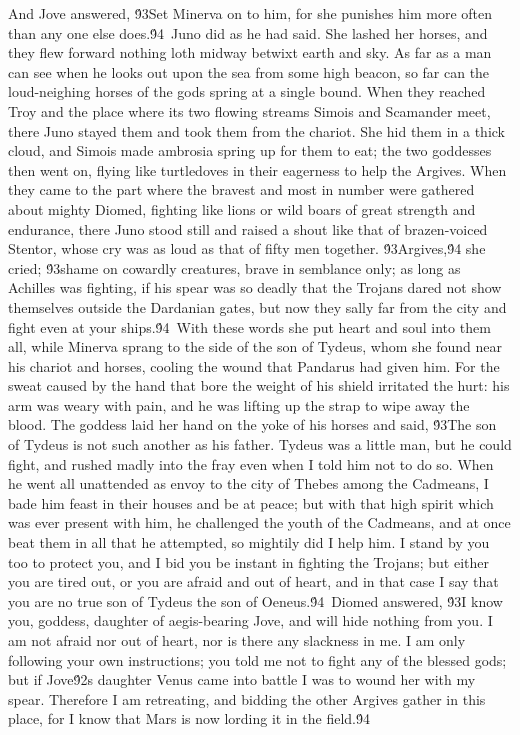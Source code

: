 {And Jove answered, \'93Set Minerva on to him, for she punishes him more often than any one else does.\'94\
Juno did as he had said. She lashed her horses, and they flew forward nothing loth midway betwixt earth and sky. As far as a man can see when he looks out upon the sea from some high beacon, so far can the loud-neighing horses of the gods spring at a single bound. When they reached Troy and the place where its two flowing streams Simois and Scamander meet, there Juno stayed them and took them from the chariot. She hid them in a thick cloud, and Simois made ambrosia spring up for them to eat; the two goddesses then went on, flying like turtledoves in their eagerness to help the Argives. When they came to the part where the bravest and most in number were gathered about mighty Diomed, fighting like lions or wild boars of great strength and endurance, there Juno stood still and raised a shout like that of brazen-voiced Stentor, whose cry was as loud as that of fifty men together. \'93Argives,\'94 she cried; \'93shame on cowardly creatures, brave in semblance only; as long as Achilles was fighting, if his spear was so deadly that the Trojans dared not show themselves outside the Dardanian gates, but now they sally far from the city and fight even at your ships.\'94\
With these words she put heart and soul into them all, while Minerva sprang to the side of the son of Tydeus, whom she found near his chariot and horses, cooling the wound that Pandarus had given him. For the sweat caused by the hand that bore the weight of his shield irritated the hurt: his arm was weary with pain, and he was lifting up the strap to wipe away the blood. The goddess laid her hand on the yoke of his horses and said, \'93The son of Tydeus is not such another as his father. Tydeus was a little man, but he could fight, and rushed madly into the fray even when I told him not to do so. When he went all unattended as envoy to the city of Thebes among the Cadmeans, I bade him feast in their houses and be at peace; but with that high spirit which was ever present with him, he challenged the youth of the Cadmeans, and at once beat them in all that he attempted, so mightily did I help him. I stand by you too to protect you, and I bid you be instant in fighting the Trojans; but either you are tired out, or you are afraid and out of heart, and in that case I say that you are no true son of Tydeus the son of Oeneus.\'94\
Diomed answered, \'93I know you, goddess, daughter of aegis-bearing Jove, and will hide nothing from you. I am not afraid nor out of heart, nor is there any slackness in me. I am only following your own instructions; you told me not to fight any of the blessed gods; but if Jove\'92s daughter Venus came into battle I was to wound her with my spear. Therefore I am retreating, and bidding the other Argives gather in this place, for I know that Mars is now lording it in the field.\'94\
}
